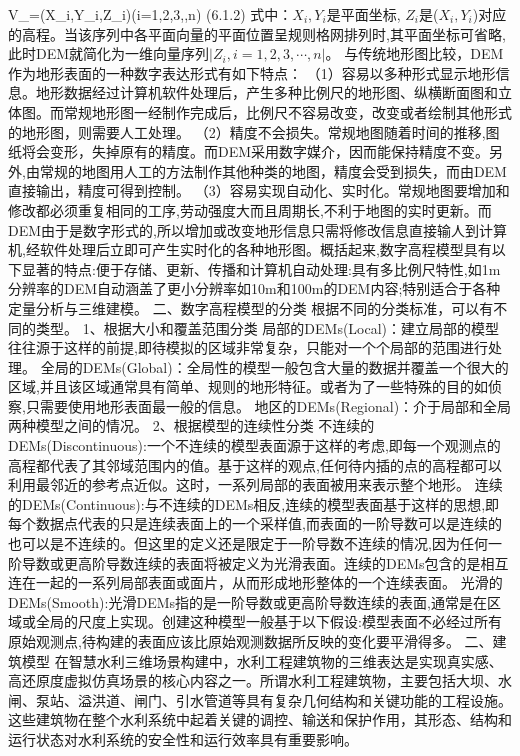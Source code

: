 {{V_=(X_i,Y_i,Z_i)(i=1,2,3,\cdots,n) \] (6.1.2) 式中：\(X_i,Y_i\)是平面坐标, \(Z_i\)是(\(X_i,Y_i\))对应的高程。当该序列中各平面向量的平面位置呈规则格网排列时,其平面坐标可省略,此时DEM就简化为一维向量序列\(|Z_i,i=1,2,3,\cdots,n|\)。 与传统地形图比较，DEM作为地形表面的一种数字表达形式有如下特点： （1）容易以多种形式显示地形信息。地形数据经过计算机软件处理后，产生多种比例尺的地形图、纵横断面图和立体图。而常规地形图一经制作完成后，比例尺不容易改变，改变或者绘制其他形式的地形图，则需要人工处理。 （2）精度不会损失。常规地图随着时间的推移,图纸将会变形，失掉原有的精度。而DEM采用数字媒介，因而能保持精度不变。另外,由常规的地图用人工的方法制作其他种类的地图，精度会受到损失，而由DEM直接输出，精度可得到控制。 （3）容易实现自动化、实时化。常规地图要增加和修改都必须重复相同的工序,劳动强度大而且周期长,不利于地图的实时更新。而DEM由于是数字形式的,所以增加或改变地形信息只需将修改信息直接输人到计算机,经软件处理后立即可产生实时化的各种地形图。概括起来,数字高程模型具有以下显著的特点:便于存储、更新、传播和计算机自动处理:具有多比例尺特性,如1m分辨率的DEM自动涵盖了更小分辨率如10m和100m的DEM内容;特别适合于各种定量分析与三维建模。 二、数字高程模型的分类 根据不同的分类标准，可以有不同的类型。 1、根据大小和覆盖范围分类 局部的DEMs(Local)：建立局部的模型往往源于这样的前提,即待模拟的区域非常复杂，只能对一个个局部的范围进行处理。 全局的DEMs(Global)：全局性的模型一般包含大量的数据并覆盖一个很大的区域,并且该区域通常具有简单、规则的地形特征。或者为了一些特殊的目的如侦察,只需要使用地形表面最一般的信息。 地区的DEMs(Regional)：介于局部和全局两种模型之间的情况。 2、根据模型的连续性分类 不连续的DEMs(Discontinuous):一个不连续的模型表面源于这样的考虑,即每一个观测点的高程都代表了其邻域范围内的值。基于这样的观点,任何待内插的点的高程都可以利用最邻近的参考点近似。这时，一系列局部的表面被用来表示整个地形。 连续的DEMs(Continuous):与不连续的DEMs相反,连续的模型表面基于这样的思想,即每个数据点代表的只是连续表面上的一个采样值,而表面的一阶导数可以是连续的也可以是不连续的。但这里的定义还是限定于一阶导数不连续的情况,因为任何一阶导数或更高阶导数连续的表面将被定义为光滑表面。连续的DEMs包含的是相互连在一起的一系列局部表面或面片，从而形成地形整体的一个连续表面。 光滑的DEMs(Smooth):光滑DEMs指的是一阶导数或更高阶导数连续的表面,通常是在区域或全局的尺度上实现。创建这种模型一般基于以下假设:模型表面不必经过所有原始观测点,待构建的表面应该比原始观测数据所反映的变化要平滑得多。 二、建筑模型 在智慧水利三维场景构建中，水利工程建筑物的三维表达是实现真实感、高还原度虚拟仿真场景的核心内容之一。所谓水利工程建筑物，主要包括大坝、水闸、泵站、溢洪道、闸门、引水管道等具有复杂几何结构和关键功能的工程设施。这些建筑物在整个水利系统中起着关键的调控、输送和保护作用，其形态、结构和运行状态对水利系统的安全性和运行效率具有重要影响。 }}
